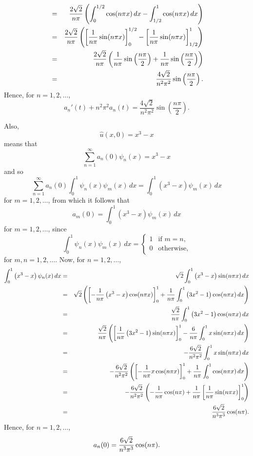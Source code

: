\begin{solution}
\begin{enumerate}
\begin{eqnarray*}
\\
&=&\frac{2\sqrt{2}}{n\pi}\left(\int_0^{1/2} \cos(n\pi x)\,dx-\int_{1/2}^1 \cos(n\pi x)\,dx\right)
\\
&=&\frac{2\sqrt{2}}{n\pi}\left(\left[{1 \over n\pi}\sin(n\pi x)\right]_0^{1/2}-\left[{1 \over n\pi}\sin(n\pi x)\right]_{1/2}^1\right)
\\
&=&\frac{2\sqrt{2}}{n\pi}\left({1 \over n\pi}\sin\left(\frac{n\pi}{2}\right)+{1 \over n\pi}\sin\left(\frac{n\pi}{2}\right)\right)
\\
&=&\frac{4\sqrt{2}}{n^2\pi^2}\sin\left(\frac{n\pi}{2}\right).
\end{eqnarray*}
Hence, for $n=1,2,\ldots$,
\[
a_n'(t)+n^2\pi^2 a_n(t)=\frac{4\sqrt{2}}{n^2\pi^2}\sin\left(\frac{n\pi}{2}\right).
\]

Also,
\[
\hat{u}(x,0)=x^3-x
\]
means that
\[
\sum_{n=1}^\infty a_n(0) \psi_n (x)=x^3-x
\]
and so
\[
\sum_{n=1}^\infty a_n(0) \int_0^1\psi_n (x)\psi_m (x)\,dx=\int_0^1\left(x^3-x\right)\psi_m (x)\,dx
\]
for $m=1,2,\ldots$, from which it follows that
\[
a_m(0)=\int_0^1\left(x^3-x\right)\psi_m (x)\,dx
\]
for $m=1,2,\ldots$, since
\[
\int_0^1\psi_n (x)\psi_m (x)\,dx = \left\{\begin{array}{ll} 1 & \mbox{if }m=n, \\ 0 & \mbox{otherwise,} \end{array}\right.
\]
for $m,n=1,2,\ldots$. Now, for $n=1,2,\ldots$,
\begin{eqnarray*}
\int_0^1\left(x^3-x\right)\psi_n(x)\,dx&=& \sqrt{2}\int_0^1 \left(x^3-x\right)\sin(n\pi x)\,dx
\\
&=&\sqrt{2}\left(\left[-{1 \over n\pi}\left(x^3-x\right)\cos(n\pi x)\right]_0^1+{1 \over n\pi}\int_0^1 \left(3x^2-1\right)\cos(n\pi x)\,dx\right)
\\
&=&{\sqrt{2} \over n\pi}\int_0^1 \left(3x^2-1\right)\cos(n\pi x)\,dx
\\
&=&{\sqrt{2} \over n\pi}\left(\left[{1 \over n\pi}\left(3x^2-1\right)\sin(n\pi x)\right]_0^1-{6 \over n\pi}\int_0^1 x\sin(n\pi x)\,dx\right)
\\
&=&-{6\sqrt{2} \over n^2\pi^2}\int_0^1 x\sin(n\pi x)\,dx
\\
&=&-{6\sqrt{2} \over n^2\pi^2}\left(\left[-{1 \over n\pi}x\cos(n\pi x)\right]_0^1+{1 \over n\pi}\int_0^1 \cos(n\pi x)\,dx\right)
\\
&=&-{6\sqrt{2} \over n^2\pi^2}\left(-{1 \over n\pi}\cos(n\pi)+{1 \over n\pi}\left[{1 \over n\pi} \sin(n\pi x)\right]_0^1\right)
\\
&=&{6\sqrt{2} \over n^3\pi^3}\cos(n\pi).
\end{eqnarray*}
Hence, for $n=1,2,\ldots$,
\[
a_n(0)={6\sqrt{2} \over n^3\pi^3}\cos(n\pi).
\]


\end{enumerate}
\end{solution}
